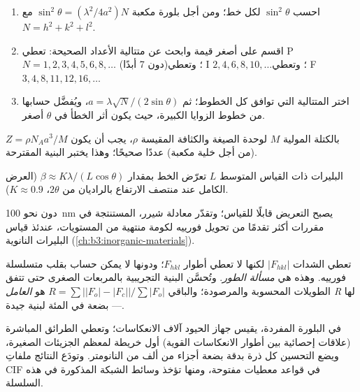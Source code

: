 \begin{method}\label{met:b3:x-ray-diffraction:index-cubic}
\begin{enumerate}
  \item احسب $\sin^2\theta$ لكل خط؛ ومن أجل بلورة مكعبة $\sin^2\theta =
        (\lambda^2/4a^2)N$ مع $N = h^2 + k^2 + l^2$.
  \item اقسم على أصغر قيمة وابحث عن متتالية الأعداد الصحيحة: تعطي P
        $N = 1, 2, 3, 4, 5, 6, 8, \dots$ (دون 7 أبدًا)؛ وتعطي I $2, 4, 6, 8, 10, \dots$؛ وتعطي F
        $3, 4, 8, 11, 12, 16, \dots$
  \item اختر المتتالية التي توافق كل الخطوط؛ ثم $a = \lambda\sqrt N/(2\sin\theta)$، ويُفضَّل
        حسابها من خطوط الزوايا الكبيرة، حيث يكون أثر الخطأ في $\theta$ أصغر.
\end{enumerate}
\end{method}

\begin{method}\label{met:b3:x-ray-diffraction:z-from-density}
بالكتلة المولية $M$ لوحدة الصيغة والكثافة المقيسة $\rho$، يجب أن يكون $Z =
\rho N_Aa^3/M$ (من أجل خلية مكعبة) عددًا صحيحًا؛ وهذا يختبر البنية
المقترحة.
\end{method}

\begin{proposition}\label{prop:b3:x-ray-diffraction:scherrer}
البليرات ذات القياس المتوسط $L$ تعرّض الخط بمقدار $\beta \approx K\lambda/(L\cos\theta)$ (العرض
الكامل عند منتصف الارتفاع بالراديان من $2\theta$، $K \approx 0.9$).
\end{proposition}
\admitted

دون نحو \qty{100}{nm} يصبح التعريض قابلًا للقياس؛ وتقدّر معادلة شيرر،
المستنتجة في مقررات أكثر تقدمًا من تحويل فورييه لكومة
منتهية من المستويات، عندئذ قياس البليرات النانوية
(\cref{ch:b3:inorganic-materials}).

\begin{definition}\label{def:b3:x-ray-diffraction:refinement}
تعطي الشدات $|F_{hkl}|$ لكنها لا تعطي أطوار $F_{hkl}$؛ ودونها
لا يمكن حساب  بقلب متسلسلة
فورييه. وهذه هي \emph{مسألة الطور}. وتُحسَّن البنية التجريبية
بالمربعات الصغرى حتى تتفق الطويلات المحسوبة والمرصودة؛ 
والباقي $R = \sum\big||F_o| - |F_c|\big|/\sum|F_o|$ هو \emph{العامل
R} لها --- بضعة في المئة لبنية جيدة.
\end{definition}

في البلورة المفردة، يقيس جهاز الحيود آلاف الانعكاسات؛ 
وتعطي الطرائق المباشرة (علاقات إحصائية بين أطوار الانعكاسات
القوية) أول خريطة  لمعظم الجزيئات الصغيرة، 
ويضع التحسين كل ذرة بدقة بضعة أجزاء من ألف من النانومتر. 
وتودَع النتائج ملفاتِ CIF في قواعد معطيات مفتوحة، ومنها تؤخذ وسائط
الشبكة المذكورة في هذه السلسلة.

